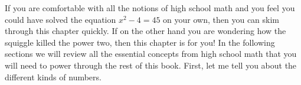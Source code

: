 	\bigskip

	If you are comfortable with all the notions of high school math
	and you feel you could have solved the equation $x^2-4=45$ on your own,		%
	then you can skim through this chapter quickly.
	If on the other hand you are wondering how the squiggle killed the power two,
	then this chapter is for you!
	In the following sections we will review all the essential concepts from
	high school math that you will need to power through the rest of this book.
	First, let me tell you about the different kinds of numbers.

